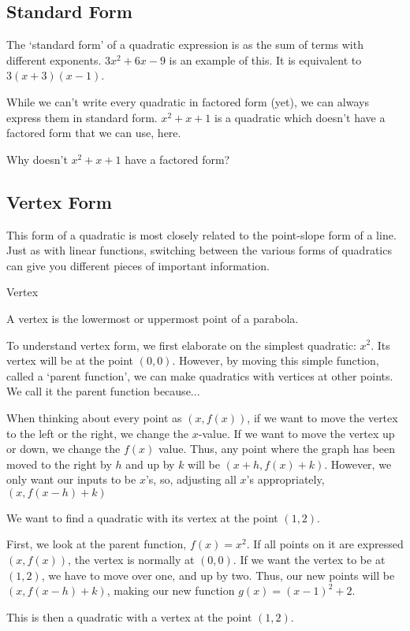 \subsection*{Standard Form}

The `standard form' of a quadratic expression is as the sum of terms with different exponents.  $3x^2 + 6x - 9$ is an example of this.  It is equivalent to $3(x + 3)(x - 1)$.

While we can't write every quadratic in factored form (yet), we can always express them in standard form.  $x^2 +x+ 1$ is a quadratic which doesn't have a factored form that we can use, here.

\begin{prblm}
Why doesn't $x^2 +x + 1$ have a factored form?
\end{prblm}

\subsection*{Vertex Form}

This form of a quadratic is most closely related to the point-slope form of a line.  Just as with linear functions, switching between the various forms of quadratics can give you different pieces of important information.

\begin{defn} Vertex

A vertex is the lowermost or uppermost point of a parabola.
\end{defn}

To understand vertex form, we first elaborate on the simplest quadratic: $x^2$.  Its vertex will be at the point $(0,0)$.  However, by moving this simple function, called a `parent function', we can make quadratics with vertices at other points.  We call it the parent function because...

When thinking about every point as $(x, f(x))$, if we want to move the vertex to the left or the right, we change the $x$-value.  If we want to move the vertex up or down, we change the $f(x)$ value.  Thus, any point where the graph has been moved to the right by $h$ and up by $k$ will be $(x + h, f(x) + k)$.  However, we only want our inputs to be $x$'s, so, adjusting all $x$'s appropriately, $(x, f(x-h)+k)$

\begin{example}

We want to find a quadratic with its vertex at the point $(1,2)$.

First, we look at the parent function, $f(x) = x^2$.  If all points on it are expressed $(x, f(x))$, the vertex is normally at $(0,0)$.  If we want the vertex to be at $(1,2)$, we have to move over one, and up by two.  Thus, our new points will be $(x, f(x-h)+k)$, making our new function $g(x) = (x-1)^2 + 2$.

This is then a quadratic with a vertex at the point $(1,2)$.

\end{example}

